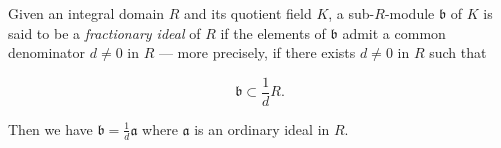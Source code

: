 Given an integral domain $R$ and its quotient field $K$, a sub-$R$-module $\mathfrak{b}$ of $K$ is said to be a \textit{fractionary ideal} of $R$ if the elements of $\mathfrak{b}$ admit a common denominator $d \neq 0$ in $R$ — more precisely, if there exists $d \neq 0$ in $R$ such that

$$\mathfrak{b} \subset \frac{1}{d}R.$$

Then we have $\mathfrak{b} = \frac{1}{d}\mathfrak{a}$ where $\mathfrak{a}$ is an ordinary ideal in $R$.
